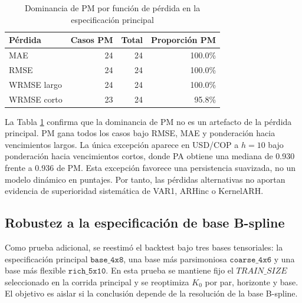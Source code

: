 \documentclass[a4paper,11pt]{article}
\begin{document}
\begin{table}[H]
\centering
\caption{Dominancia de PM por función de pérdida en la especificación principal}
\label{tab:loss_robustness}
\small
\begin{tabular}{lrrr}
\toprule
Pérdida & Casos PM & Total & Proporción PM \\
\midrule
MAE & 24 & 24 & 100.0\% \\
RMSE & 24 & 24 & 100.0\% \\
WRMSE largo & 24 & 24 & 100.0\% \\
WRMSE corto & 23 & 24 & 95.8\% \\
\bottomrule
\end{tabular}
\end{table}

La Tabla \ref{tab:loss_robustness} confirma que la dominancia de PM no es un artefacto de la pérdida principal. PM gana todos los casos bajo RMSE, MAE y ponderación hacia vencimientos largos. La única excepción aparece en USD/COP a \(h=10\) bajo ponderación hacia vencimientos cortos, donde PA obtiene una mediana de 0.930 frente a 0.936 de PM. Esta excepción favorece una persistencia suavizada, no un modelo dinámico en puntajes. Por tanto, las pérdidas alternativas no aportan evidencia de superioridad sistemática de VAR1, ARHinc o KernelARH.

\subsection{Robustez a la especificación de base B-spline}

Como prueba adicional, se reestimó el backtest bajo tres bases tensoriales: la especificación principal \(\texttt{base\_4x8}\), una base más parsimoniosa \(\texttt{coarse\_4x6}\) y una base más flexible \(\texttt{rich\_5x10}\). En esta prueba se mantiene fijo el \(TRAIN\_SIZE\) seleccionado en la corrida principal y se reoptimiza \(K_0\) por par, horizonte y base. El objetivo es aislar si la conclusión depende de la resolución de la base B-spline.
\end{document}
